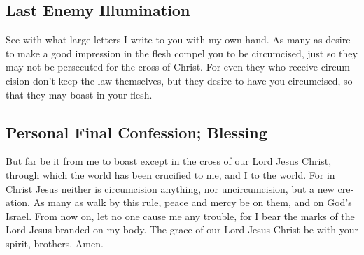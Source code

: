 \begin{paracol}{2}
\begin{otherlanguage}{english}
\hypertarget{last-enemy-illumination}{%
\subsection{Last Enemy Illumination}\label{last-enemy-illumination}}

 See with what large letters I write to you with my own
hand.  As many as desire to make a good impression in the
flesh compel you to be circumcised, just so they may not be persecuted
for the cross of Christ.  For even they who receive
circumcision don't keep the law themselves, but they desire to have you
circumcised, so that they may boast in your flesh.

\hypertarget{personal-final-confession-blessing}{%
\subsection{Personal Final Confession;
Blessing}\label{personal-final-confession-blessing}}

 But far be it from me to boast except in the cross of
our Lord Jesus Christ, through which the world has been crucified to me,
and I to the world.  For in Christ Jesus neither is
circumcision anything, nor uncircumcision, but a new creation.
 As many as walk by this rule, peace and mercy be on
them, and on God's Israel.  From now on, let no one cause
me any trouble, for I bear the marks of the Lord Jesus branded on my
body.  The grace of our Lord Jesus Christ be with your
spirit, brothers. Amen. \end{otherlanguage}
\end{paracol}
